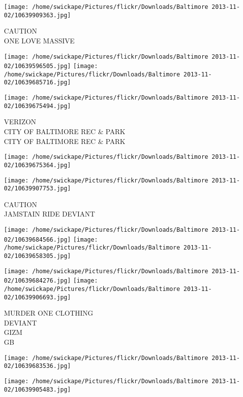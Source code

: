 \documentclass[10pt,letterpaper]{article}
\begin{document}
\vspace{0.25in}
\texttt{[image: /home/swickape/Pictures/flickr/Downloads/Baltimore 2013-11-02/10639909363.jpg]}

CAUTION\\
ONE LOVE MASSIVE\\
\pagebreak

\texttt{[image: /home/swickape/Pictures/flickr/Downloads/Baltimore 2013-11-02/10639596505.jpg]}
\texttt{[image: /home/swickape/Pictures/flickr/Downloads/Baltimore 2013-11-02/10639685716.jpg]}

\vspace{0.25in}
\texttt{[image: /home/swickape/Pictures/flickr/Downloads/Baltimore 2013-11-02/10639675494.jpg]}

VERIZON\\
CITY OF BALTIMORE REC \& PARK\\
CITY OF BALTIMORE REC \& PARK\\
\pagebreak

\texttt{[image: /home/swickape/Pictures/flickr/Downloads/Baltimore 2013-11-02/10639675364.jpg]}

\vspace{0.25in}
\texttt{[image: /home/swickape/Pictures/flickr/Downloads/Baltimore 2013-11-02/10639907753.jpg]}

CAUTION\\
JAMSTAIN RIDE DEVIANT\\
\pagebreak

\texttt{[image: /home/swickape/Pictures/flickr/Downloads/Baltimore 2013-11-02/10639684566.jpg]}
\texttt{[image: /home/swickape/Pictures/flickr/Downloads/Baltimore 2013-11-02/10639658305.jpg]}

\texttt{[image: /home/swickape/Pictures/flickr/Downloads/Baltimore 2013-11-02/10639684276.jpg]}
\texttt{[image: /home/swickape/Pictures/flickr/Downloads/Baltimore 2013-11-02/10639906693.jpg]}

MURDER ONE CLOTHING\\
DEVIANT\\
GIZM\\
GB\\
\pagebreak

\texttt{[image: /home/swickape/Pictures/flickr/Downloads/Baltimore 2013-11-02/10639683536.jpg]}

\vspace{0.25in}
\texttt{[image: /home/swickape/Pictures/flickr/Downloads/Baltimore 2013-11-02/10639905483.jpg]}
\end{document}
